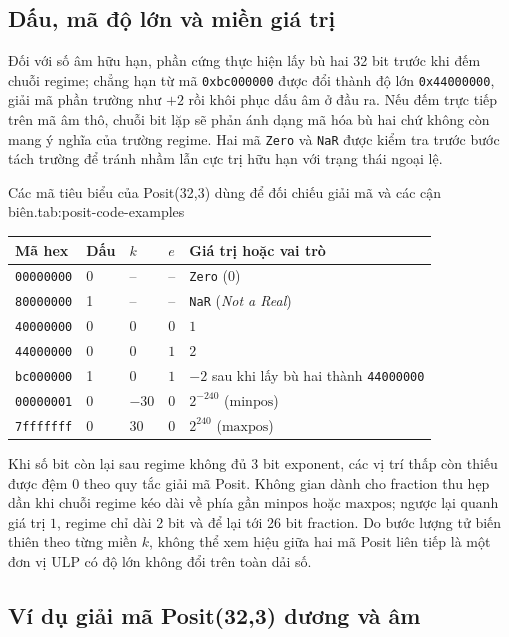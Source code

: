 \subsection{Dấu, mã độ lớn và miền giá trị}

Đối với số âm hữu hạn, phần cứng thực hiện lấy bù hai 32 bit trước khi đếm chuỗi
regime; chẳng hạn từ mã \texttt{0xbc000000} được đổi thành độ lớn \texttt{0x44000000},
giải mã phần trường như $+2$ rồi khôi phục dấu âm ở đầu ra. Nếu đếm trực tiếp trên
mã âm thô, chuỗi bit lặp sẽ phản ánh dạng mã hóa bù hai chứ không còn mang ý nghĩa
của trường regime. Hai mã \texttt{Zero} và \texttt{NaR} được kiểm tra trước bước
tách trường để tránh nhầm lẫn cực trị hữu hạn với trạng thái ngoại lệ.

\begin{engineeringtable}{Các mã tiêu biểu của Posit(32,3) dùng để đối chiếu giải mã và các cận biên.}{tab:posit-code-examples}
\begin{tabularx}{\linewidth}{@{}llllY@{}}
\toprule
Mã hex & Dấu & $k$ & $e$ & Giá trị hoặc vai trò \\
\midrule
\texttt{00000000} & 0 & -- & -- & \texttt{Zero} ($0$) \\
\texttt{80000000} & 1 & -- & -- & \texttt{NaR} (\textit{Not a Real}) \\
\texttt{40000000} & 0 & $0$ & $0$ & $1$ \\
\texttt{44000000} & 0 & $0$ & $1$ & $2$ \\
\texttt{bc000000} & 1 & $0$ & $1$ & $-2$ sau khi lấy bù hai thành \texttt{44000000} \\
\texttt{00000001} & 0 & $-30$ & $0$ & $2^{-240}$ ($\mathrm{minpos}$) \\
\texttt{7fffffff} & 0 & $30$ & $0$ & $2^{240}$ ($\mathrm{maxpos}$) \\
\bottomrule
\end{tabularx}
\end{engineeringtable}

Khi số bit còn lại sau regime không đủ 3 bit exponent, các vị trí thấp còn thiếu
được đệm 0 theo quy tắc giải mã Posit. Không gian dành cho fraction thu hẹp dần khi
chuỗi regime kéo dài về phía gần $\mathrm{minpos}$ hoặc $\mathrm{maxpos}$; ngược
lại quanh giá trị $1$, regime chỉ dài 2 bit và để lại tới 26 bit fraction. Do bước
lượng tử biến thiên theo từng miền $k$, không thể xem hiệu giữa hai mã Posit liên
tiếp là một đơn vị ULP có độ lớn không đổi trên toàn dải số.

\subsection{Ví dụ giải mã Posit(32,3) dương và âm}

